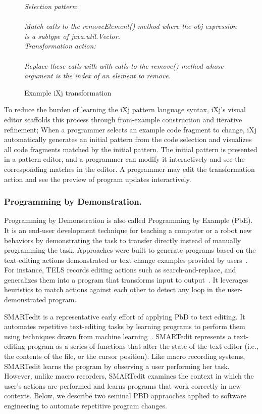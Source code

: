 \begin{figure} 
{\it Selection pattern}: \\
 \\
\it{Match calls to the {removeElement()} method where the {obj} expression is a subtype of {java.util.Vector}.} \\
{\it Transformation action}:\\
 \\
\it{Replace these calls with with calls to the {remove()} method whose argument is the index of an element to remove.} 
\caption{Example iXj transformation} 
\label{ixj_example} 
\end{figure} 


To reduce the burden of learning the iXj pattern language syntax, iXj's visual editor scaffolds this process through from-example construction and iterative refinement; When a programmer selects an example code fragment to change, iXj automatically generates an initial pattern from the code selection and visualizes all code fragments matched by the initial pattern. The initial pattern is presented in a pattern editor, and a programmer can modify it interactively and see the corresponding matches in the editor. A programmer may edit the transformation action and see the preview of program updates interactively. 

\subsubsection{Programming by Demonstration.} 
Programming by Demonstration is also called Programming by Example (PbE). It is an end-user development technique for teaching a computer or a robot new behaviors by demonstrating the task to transfer directly instead of manually programming the task.  Approaches were built to generate programs based on the text-editing actions demonstrated or text change examples provided by users~\cite{Nix1984,wiki:bsd-comparison,LaH1995,LWD2001}. For instance, TELS records editing actions such as search-and-replace, and generalizes them into a program that transforms input to output~\cite{wiki:bsd-comparison}. It leverages heuristics to match actions against each other to detect any loop in the user-demonstrated program. 

SMARTedit is a representative early effort of applying PbD to text editing. It automates repetitive text-editing tasks by learning programs to perform them using techniques drawn from machine learning~\cite{LWD2001}. SMARTedit represents a text-editing program as a series of functions that alter the state of the text editor (i.e., the contents of the file, or the cursor position). Like macro recording systems, SMARTedit learns the program by observing a user performing her task. However, unlike macro recorders, SMARTedit examines the context in which the user's actions are performed and learns programs that work correctly in new contexts. Below, we describe two seminal PBD appraoches applied to software engineering to automate repetitive program changes. 


